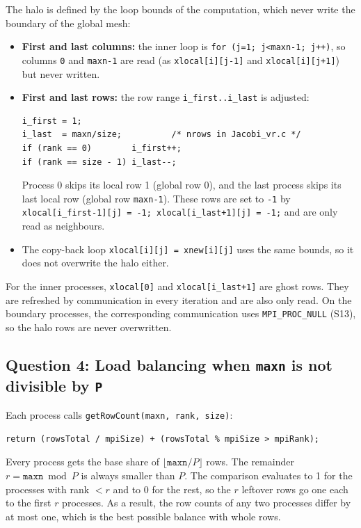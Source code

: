 \documentclass[11pt,a4paper]{article}
\begin{document}
The halo is defined by the loop bounds of the computation, which never write the boundary of the global mesh:
\begin{itemize}
  \item \textbf{First and last columns:} the inner loop is \texttt{for (j=1; j<maxn-1; j++)}, so columns \texttt{0} and \texttt{maxn-1} are read (as \texttt{xlocal[i][j-1]} and \texttt{xlocal[i][j+1]}) but never written.
  \item \textbf{First and last rows:} the row range \texttt{i\_first..i\_last} is adjusted:
\begin{lstlisting}
i_first = 1;
i_last  = maxn/size;          /* nrows in Jacobi_vr.c */
if (rank == 0)        i_first++;
if (rank == size - 1) i_last--;
\end{lstlisting}
  Process 0 skips its local row 1 (global row 0), and the last process skips its last local row (global row \texttt{maxn-1}). These rows are set to \texttt{-1} by \texttt{xlocal[i\_first-1][j] = -1; xlocal[i\_last+1][j] = -1;} and are only read as neighbours.
  \item The copy-back loop \texttt{xlocal[i][j] = xnew[i][j]} uses the same bounds, so it does not overwrite the halo either.
\end{itemize}
For the inner processes, \texttt{xlocal[0]} and \texttt{xlocal[i\_last+1]} are ghost rows. They are refreshed by communication in every iteration and are also only read. On the boundary processes, the corresponding communication uses \texttt{MPI\_PROC\_NULL} (S13), so the halo rows are never overwritten.

\subsection*{Question 4: Load balancing when \texttt{maxn} is not divisible by \texttt{P}}

Each process calls \texttt{getRowCount(maxn, rank, size)}:
\begin{lstlisting}
return (rowsTotal / mpiSize) + (rowsTotal % mpiSize > mpiRank);
\end{lstlisting}
Every process gets the base share of $\lfloor \texttt{maxn}/P \rfloor$ rows. The remainder $r = \texttt{maxn} \bmod P$ is always smaller than $P$. The comparison evaluates to 1 for the processes with rank $< r$ and to 0 for the rest, so the $r$ leftover rows go one each to the first $r$ processes. As a result, the row counts of any two processes differ by at most one, which is the best possible balance with whole rows.
\end{document}
